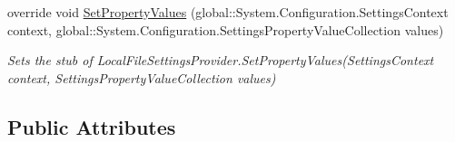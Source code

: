 \begin{DoxyCompactItemize}
override void \hyperlink{class_system_1_1_configuration_1_1_fakes_1_1_stub_local_file_settings_provider_a1540b9f00930e7ed665ce44bd09bcf5e}{Set\-Property\-Values} (global\-::\-System.\-Configuration.\-Settings\-Context context, global\-::\-System.\-Configuration.\-Settings\-Property\-Value\-Collection values)
\begin{DoxyCompactList}\small\item\em Sets the stub of Local\-File\-Settings\-Provider.\-Set\-Property\-Values(\-Settings\-Context context, Settings\-Property\-Value\-Collection values)\end{DoxyCompactList}\end{DoxyCompactItemize}
\subsection*{Public Attributes}
